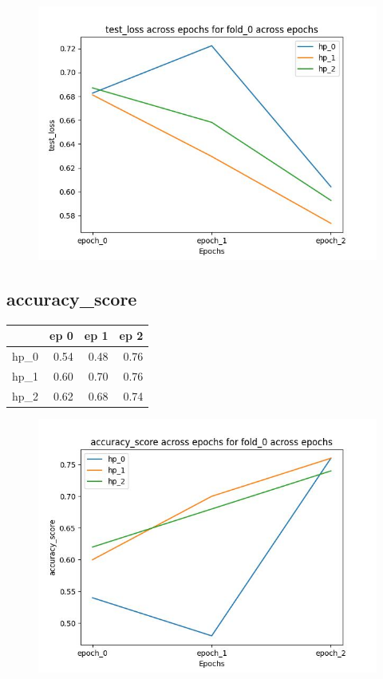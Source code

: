 \documentclass{article}
\begin{document}
\begin{figure}[H]
\includegraphics[scale = 0.75]{fold_0/test_loss}
\end{figure}
\subsection{accuracy\_score}
\begin{tabular}{lrrr}
\toprule
{} &  ep 0 &  ep 1 &  ep 2 \\
\midrule
hp\_0 &  0.54 &  0.48 &  0.76 \\
hp\_1 &  0.60 &  0.70 &  0.76 \\
hp\_2 &  0.62 &  0.68 &  0.74 \\
\bottomrule
\end{tabular}

\begin{figure}[H]
\includegraphics[scale = 0.75]{fold_0/accuracy_score}
\end{figure}
\end{document}
